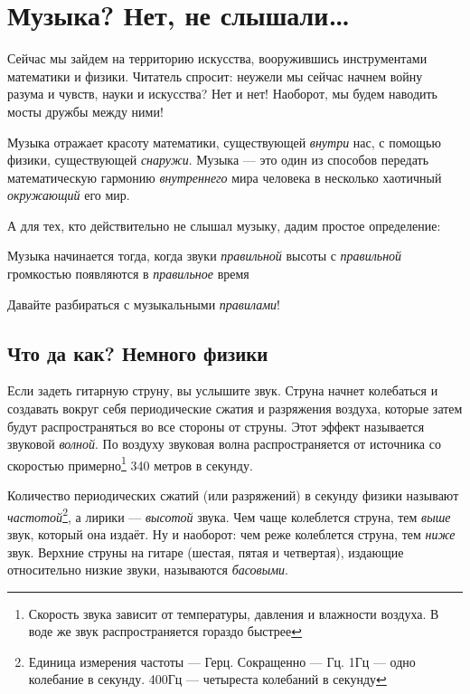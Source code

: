 \chapter{Музыка? Нет, не слышали\ldots}
\label{ch:music}

Сейчас мы зайдем на территорию искусства, вооружившись инструментами математики и физики. Читатель спросит: неужели мы сейчас начнем войну разума и чувств, науки и искусства? Нет и нет! Наоборот, мы будем наводить мосты дружбы между ними! 

Музыка отражает красоту математики, существующей \emph{внутри} нас, с помощью физики, существующей \emph{снаружи}. Музыка --- это один из способов передать математическую гармонию \emph{внутреннего} мира человека в несколько хаотичный \emph{окружающий} его мир.

А для тех, кто действительно не слышал музыку, дадим простое определение:

\begin{Definition}[Музыка]
    Музыка начинается тогда, когда звуки \emph{правильной} высоты с \emph{правильной} громкостью появляются в \emph{правильное} время
\end{Definition}

Давайте разбираться с музыкальными \emph{правилами}!


\section{Что да как? Немного физики}
\label{ch:music:physics}

Если задеть гитарную струну, вы услышите звук. Струна начнет колебаться и создавать вокруг себя периодические сжатия и разряжения воздуха, которые затем будут распространяться во все стороны от струны. Этот эффект называется звуковой \emph{волной}. По воздуху звуковая волна распространяется от источника со скоростью примерно\footnote{Скорость звука зависит от температуры, давления и влажности воздуха. В воде же звук распространяется гораздо быстрее} 340 метров в секунду.

Количество периодических сжатий (или разряжений) в секунду физики называют \emph{частотой}\footnote{Единица измерения частоты --- Герц. Сокращенно --- Гц. 1Гц --- одно колебание в секунду. 400Гц --- четыреста колебаний в секунду}, а лирики --- \emph{высотой} звука. Чем чаще колеблется струна, тем \emph{выше} звук, который она издаёт. Ну и наоборот: чем реже колеблется струна, тем \emph{ниже} звук. Верхние струны на гитаре (шестая, пятая и четвертая), издающие относительно низкие звуки, называются \emph{басовыми}.

